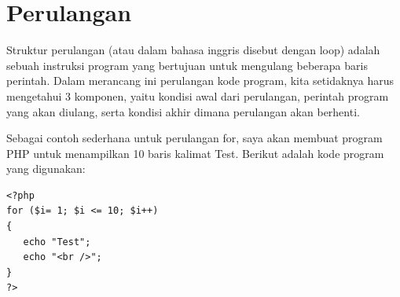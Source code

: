 \section{Perulangan}
Struktur perulangan (atau dalam bahasa inggris disebut dengan loop) adalah sebuah instruksi program yang bertujuan untuk mengulang beberapa baris perintah. Dalam merancang ini perulangan kode program, kita setidaknya harus mengetahui 3 komponen, yaitu kondisi awal dari perulangan, perintah program yang akan diulang, serta kondisi akhir dimana perulangan akan berhenti.
\par
Sebagai contoh sederhana untuk perulangan for, saya akan membuat program PHP untuk menampilkan 10 baris kalimat Test. Berikut adalah kode program yang digunakan:
\begin{lstlisting}
<?php
for ($i= 1; $i <= 10; $i++)
{
   echo "Test";
   echo "<br />";
}
?>
\end{lstlisting}
